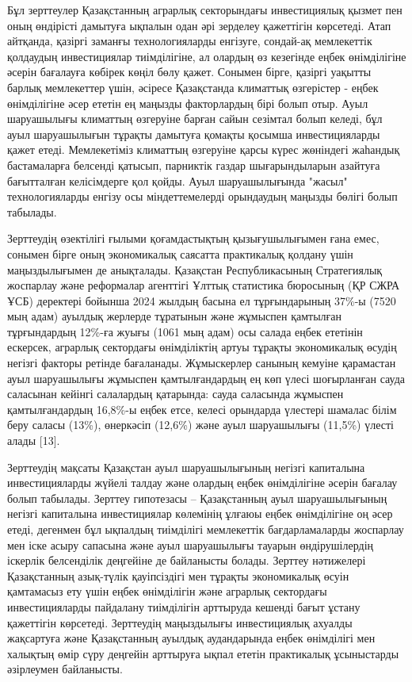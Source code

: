 \begin{multicols}{2}
Бұл зерттеулер Қазақстанның аграрлық секторындағы инвестициялық қызмет
пен оның өндірісті дамытуға ықпалын одан әрі зерделеу қажеттігін
көрсетеді. Атап айтқанда, қазіргі заманғы технологияларды енгізуге,
сондай-ақ мемлекеттік қолдаудың инвестициялар тиімділігіне, ал олардың
өз кезегінде еңбек өнімділігіне әсерін бағалауға көбірек көңіл бөлу
қажет. Сонымен бірге, қазіргі уақытты барлық мемлекеттер үшін, әсіресе
Қазақстанда климаттық өзгерістер - еңбек өнімділігіне әсер ететін ең
маңызды факторлардың бірі болып отыр. Ауыл шаруашылығы климаттың
өзгеруіне барған сайын сезімтал болып келеді, бұл ауыл шаруашылығын
тұрақты дамытуға қомақты қосымша инвестицияларды қажет етеді.
Мемлекетіміз климаттың өзгеруіне қарсы күрес жөніндегі жаһандық
бастамаларға белсенді қатысып, парниктік газдар шығарындыларын азайтуға
бағытталған келісімдерге қол қойды. Ауыл шаруашылығында "жасыл"
технологияларды енгізу осы міндеттемелерді орындаудың маңызды бөлігі
болып табылады.

Зерттеудің өзектілігі ғылыми қоғамдастықтың қызығушылығымен ғана емес,
сонымен бірге оның экономикалық саясатта практикалық қолдану үшін
маңыздылығымен де анықталады. Қазақстан Республикасының Стратегиялық
жоспарлау және реформалар агенттігі Ұлттық статистика бюросының (ҚР СЖРА
ҰСБ) деректері бойынша 2024 жылдың басына ел тұрғындарының 37\%-ы (7520
мың адам) ауылдық жерлерде тұратынын және жұмыспен қамтылған
тұрғындардың 12\%-ға жуығы (1061 мың адам) осы салада еңбек ететінін
ескерсек, аграрлық сектордағы өнімділіктің артуы тұрақты экономикалық
өсудің негізгі факторы ретінде бағаланады. Жұмыскерлер санының кемуіне
қарамастан ауыл шаруашылығы жұмыспен қамтылғандардың ең көп үлесі
шоғырланған сауда саласынан кейінгі салалардың қатарында: сауда
саласында жұмыспен қамтылғандардың 16,8\%-ы еңбек етсе, келесі орындарда
үлестері шамалас білім беру саласы (13\%), өнеркәсіп (12,6\%) және ауыл
шаруашылығы (11,5\%) үлесті алады {[}13{]}.

Зерттеудің мақсаты Қазақстан ауыл шаруашылығының негізгі капиталына
инвестицияларды жүйелі талдау және олардың еңбек өнімділігіне әсерін
бағалау болып табылады. Зерттеу гипотезасы -- Қазақстанның ауыл
шаруашылығының негізгі капиталына инвестициялар көлемінің ұлғаюы еңбек
өнімділігіне оң әсер етеді, дегенмен бұл ықпалдың тиімділігі мемлекеттік
бағдарламаларды жоспарлау мен іске асыру сапасына және ауыл шаруашылығы
тауарын өндірушілердің іскерлік белсенділік деңгейіне де байланысты
болады. Зерттеу нәтижелері Қазақстанның азық-түлік қауіпсіздігі мен
тұрақты экономикалық өсуін қамтамасыз ету үшін еңбек өнімділігін және
аграрлық сектордағы инвестицияларды пайдалану тиімділігін арттыруда
кешенді бағыт ұстану қажеттігін көрсетеді. Зерттеудің маңыздылығы
инвестициялық ахуалды жақсартуға және Қазақстанның ауылдық аудандарында
еңбек өнімділігі мен халықтың өмір сүру деңгейін арттыруға ықпал ететін
практикалық ұсыныстарды әзірлеумен байланысты.


\end{multicols}
